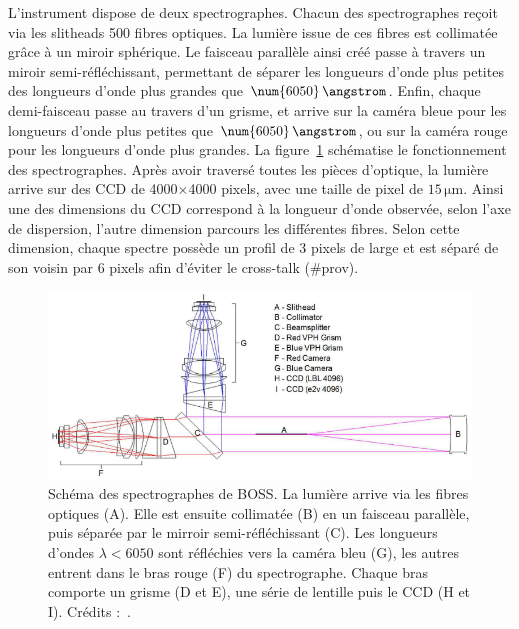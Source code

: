 \documentclass[11pt, twoside, a4paper, openright]{report}
\begin{document}
L'instrument dispose de deux spectrographes. Chacun des spectrographes reçoit via les slitheads \num{500} fibres optiques. La lumière issue de ces fibres est collimatée grâce à un miroir sphérique. Le faisceau parallèle ainsi créé passe à travers un miroir semi-réfléchissant, permettant de séparer les longueurs d'onde plus petites des longueurs d'onde plus grandes que $\num{6050}\,\angstrom$. Enfin, chaque demi-faisceau passe au travers d'un grisme, et arrive sur la caméra bleue pour les longueurs d'onde plus petites que $\num{6050}\,\angstrom$, ou sur la caméra rouge pour les longueurs d'onde plus grandes. La figure~\ref{fig:SchemaSpectro} schématise le fonctionnement des spectrographes.
Après avoir traversé toutes les pièces d'optique, la lumière arrive sur des CCD de \num{4000}$\times$\num{4000} pixels, avec une taille de pixel de $15\,\mathrm{\mu m}$. Ainsi une des dimensions du CCD correspond à la longueur d'onde observée, selon l'axe de dispersion, l'autre dimension parcours les différentes fibres. Selon cette dimension, chaque spectre possède un profil de 3 pixels de large et  est séparé de son voisin par 6 pixels afin d'éviter le cross-talk (\#prov).
\begin{figure}
  \centering
  \includegraphics[scale=0.5]{../img/eBOSS/SchemaSpectro}
  \caption{Schéma des spectrographes de BOSS. La lumière arrive via les fibres optiques (A). Elle est ensuite collimatée (B) en un faisceau parallèle, puis séparée par le mirroir semi-réfléchissant (C). Les longueurs d'ondes $\lambda < \num{6050}$ sont réfléchies vers la caméra bleu (G), les autres entrent dans le bras rouge (F) du spectrographe. Chaque bras comporte un grisme (D et E), une série de lentille puis le CCD (H et I). Crédits :~\cite{Smee2012}.}
  \label{fig:SchemaSpectro}
\end{figure}
\end{document}
